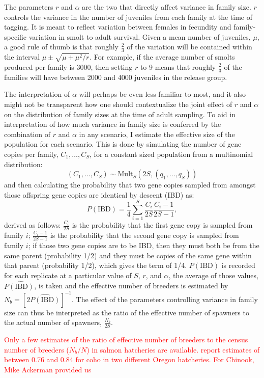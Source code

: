 \documentclass[11pt]{article}
\begin{document}
The parameters $r$ and $\alpha$ are the two that directly affect variance in family size.  $r$ 
controls the variance in the number of juveniles from each family at the time of tagging.  It is meant
to reflect variation between females in fecundity and family-specific variation in smolt to adult survival.  
Given a mean number of juveniles, $\mu$, a good rule of thumb is that roughly $\frac{2}{3}$ 
of the variation will be contained
within the interval $\mu \pm \sqrt{\mu + \mu^2/r}$.  For example, if the average number of smolts produced
per family is 3000, then setting $r$ to 9 means that roughly $\frac{2}{3}$ of the families will have
between 2000 and 4000 juveniles in the release group.


The interpretation of $\alpha$ will perhaps be even less familiar to most, and it also might not
be transparent how one should contextualize the joint effect of $r$ and $\alpha$ on the distribution
of family sizes at the time of adult sampling.  To aid in interpretation of how much variance in
family size is conferred by the combination of $r$ and $\alpha$ in any scenario, I estimate the
effective size of the population for each scenario.  This is done by simulating the number of
gene copies per family, $C_1,\ldots,C_S$,
for a constant sized population from a multinomial distribution:
\[
(C_1,\ldots, C_S) \sim \mathrm{Mult}_S(2S, (q_1, \ldots, q_S))
\]
and then calculating the probability that two gene copies sampled from amongst those offspring gene copies
are identical by descent (IBD) as:
\[
P(\mathrm{IBD}) = \frac{1}{4}\sum_{i=1}^S \frac{C_i}{2S}\frac{C_i - 1}{2S - 1},
\]
derived as follows: $\frac{C_i}{2S}$ is the probability that the first gene copy is sampled from family $i$;
$\frac{C_i - 1}{2S - 1}$ is the probability that the second gene copy is sampled from family $i$; if those two
gene copies are to be IBD, then they must both be from the same parent (probability 1/2) and they must be copies of
the same gene within that parent (probability 1/2), which gives the term of 1/4.  
$P(\mathrm{IBD})$ is recorded for each replicate at a particular value of $S$, $r$, and $\alpha$, the average
of those values, $\widehat{P(\mathrm{IBD})}$, is taken and the effective number of breeders is estimated
by $N_b = [2\widehat{P(\mathrm{IBD})}]^{-1}$.   The effect of the parameters controlling
variance in family size can thus be interpreted as the ratio of the effective number of spawners to the 
actual number of spawners, $\frac{N_b}{2S}$.

\textcolor{red}{Only a few estimates of the ratio of effective number of breeders to the census number of breeders ($N_b/N$) in salmon
hatcheries are available.  \citet{Moyeretal2007} report estimates of between 0.76 and 0.84 for coho in two different 
Oregon hatcheries.  For Chinook, Mike Ackerman provided us }
\end{document}
